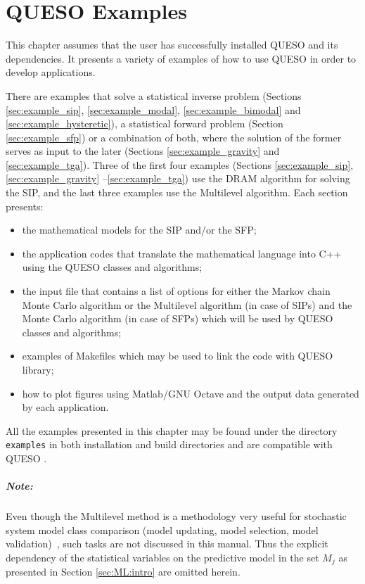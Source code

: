 
\chapter{QUESO Examples}\label{chap:Queso-examples}

This chapter assumes that the user has successfully installed QUESO and its dependencies.
%
It presents a variety of  examples of how to use QUESO in order to develop applications.

There are examples that solve a statistical inverse problem (Sections \ref{sec:example_sip}, \ref{sec:example_modal}, \ref{sec:example_bimodal} and \ref{sec:example_hysteretic}), a statistical forward problem (Section \ref{sec:example_sfp}) or a combination of both, where the solution of the former serves as input to the later (Sections \ref{sec:example_gravity} and \ref{sec:example_tga}). Three of the first four examples (Sections \ref{sec:example_sip}, \ref{sec:example_gravity} --\ref{sec:example_tga}) use the DRAM algorithm for solving the SIP, and the last three examples use the Multilevel algorithm.
Each section presents:
\begin{itemize}
 \item the mathematical models for the SIP and/or the SFP; \vspace*{-6pt}
 \item the application codes  that translate the mathematical language into C++ using the QUESO classes and algorithms;\vspace*{-6pt}
 \item  the input file that contains a list of options for either the Markov chain Monte Carlo algorithm or the Multilevel algorithm (in case of SIPs) and the Monte Carlo algorithm (in case of SFPs) which will be used by QUESO classes and algorithms;\vspace*{-6pt}
 \item examples of Makefiles which may be used to link the code  with QUESO library;\vspace*{-6pt}
 \item how to plot figures using Matlab/GNU Octave  and the output data generated by each application.
\end{itemize}


All the examples presented in this chapter may be found under the directory \texttt{examples} in both \Queso{} installation and build directories and are compatible with QUESO \QUESOversion{}.


\paragraph*{Note:} Even though the Multilevel method is a methodology very useful for  stochastic system model class comparison (model updating, model selection, model validation)~\cite{Cheung_2009A}, such tasks are not discussed in this manual. Thus the explicit dependency of the statistical variables on the predictive model in the set  $M_j$ as presented in Section \ref{sec:ML:intro} are omitted herein.



